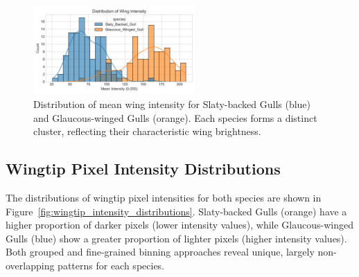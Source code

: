 \documentclass[a4paper,12pt]{report}
\begin{document}
\begin{figure}[H]
    \centering
    \includegraphics[width=0.55\textwidth]{images/REPORT_IMAGES_INTENSITY/I2/distribution.png}
    \caption{Distribution of mean wing intensity for Slaty-backed Gulls (blue) and Glaucous-winged Gulls (orange). Each species forms a distinct cluster, reflecting their characteristic wing brightness.}
    \label{fig:wing_intensity_distribution}
\end{figure}


\subsection{Wingtip Pixel Intensity Distributions}

The distributions of wingtip pixel intensities for both species are shown in Figure~\ref{fig:wingtip_intensity_distributions}. Slaty-backed Gulls (orange) have a higher proportion of darker pixels (lower intensity values), while Glaucous-winged Gulls (blue) show a greater proportion of lighter pixels (higher intensity values). Both grouped and fine-grained binning approaches reveal unique, largely non-overlapping patterns for each species.
\end{document}
